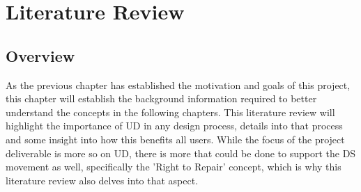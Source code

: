 
\chapter{Literature Review} %

\label{Chapter2} %


\section{Overview} %
As the previous chapter has established the motivation and goals of this project, this chapter will establish the background information required to better understand the concepts in the following chapters.
This literature review will highlight the importance of UD in any design process, details into that process and some insight into how this benefits all users.
While the focus of the project deliverable is more so on UD, there is more that could be done to support the DS movement as well, specifically the 'Right to Repair' concept, which is why this literature review also delves into that aspect.


